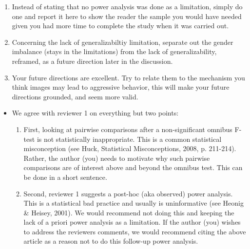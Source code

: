 \documentclass[authordate, serif, review]{jote-article}
\begin{document}
\begin{multicols}{2}
\begin{reviewend}{}
\begin{enumerate}[label=\textbf{\arabic*}), start=0]
\begin{enumerate}
            What you added are limitations but not an explanation as to why (theoretically or empirically based) your results did not replicate or why you did not find what you thought you might. 
            \begin{itemize}
                \item The suggestion by reviewer 2 on the processing being different for sexual images might be true! Is there any empirical work demonstrating that physical violence and sexual violence are processes differently? Some kind of evidence like this if any, would really drive the point home.
                \item Remove the part added.
            \end{itemize}
            \item Instead of stating that no power analysis was done as a limitation, simply do one and report it here to show the reader the sample you would have needed given you had more time to complete the study when it was carried out. 
            \item Concerning the lack of generalizabiltiy limitation, separate out the gender imbalance (stays in the limitations) from the lack of generalizability, reframed, as a future direction later in the discussion.
            \item Your future directions are excellent. Try to relate them to the mechanism you think images may lead to aggressive behavior, this will make your future directions grounded, and seem more valid.
        \end{enumerate}
    \end{enumerate}
    
    \begin{itemize}
    \item We agree with reviewer 1 on everything but two points: 
        \begin{enumerate}
            \item First, looking at pairwise comparisons after a non-significant omnibus F-test is not statistically inappropriate. This is a common statistical misconception (see Huck, Statistical Misconceptions, 2008, p. 211-214). Rather, the author (you) needs to motivate why such pairwise comparisons are of interest above and beyond the omnibus test. This can be done in a short sentence. 
            \item Second, reviewer 1 suggests a post-hoc (aka observed) power analysis. This is a statistical bad practice and usually is uninformative (see Heonig & Heisey, 2001). We would recommend not doing this and keeping the lack of a priori power analysis as a limitation. If the author (you) wishes to address the reviewers comments, we would recommend citing the above article as a reason not to do this follow-up power analysis. 
        \end{enumerate}
    \end{itemize}
\end{reviewend}


\end{multicols}
\end{document}
